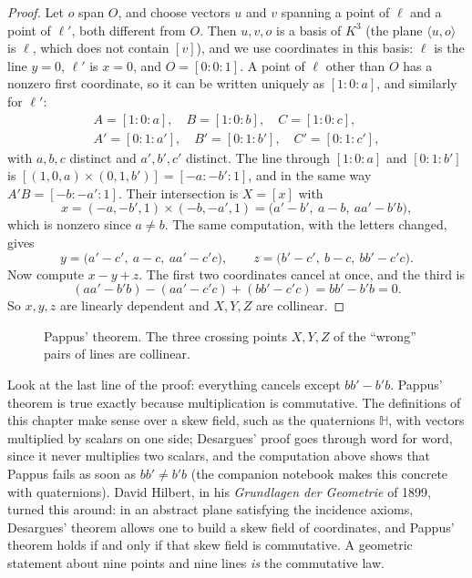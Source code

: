 \begin{proof}
Let $o$ span $O$, and choose vectors $u$ and $v$ spanning a point of $\ell$ and a point of $\ell'$, both different from $O$. Then $u,v,o$ is a basis
of $K^3$ (the plane $\langle u,o\rangle$ is $\ell$, which does not contain $[v]$), and we use coordinates in this basis: $\ell$ is the line $y=0$, $\ell'$ is
$x=0$, and $O=[0:0:1]$. A point of $\ell$ other than $O$ has a nonzero first coordinate, so it can be written uniquely as $[1:0:a]$, and
similarly for $\ell'$:
\[
\begin{gathered}
A=[1:0:a],\quad B=[1:0:b],\quad C=[1:0:c],\\
A'=[0:1:a'],\quad B'=[0:1:b'],\quad C'=[0:1:c'],
\end{gathered}
\]
with $a,b,c$ distinct and $a',b',c'$ distinct. The line through $[1:0:a]$ and $[0:1:b']$ is $[(1,0,a)\times(0,1,b')]=[-a:-b':1]$, and in the same way
$A'B=[-b:-a':1]$. Their intersection is $X=[x]$ with
\[
x=(-a,-b',1)\times(-b,-a',1)=\bigl(a'-b',\ a-b,\ aa'-b'b\bigr),
\]
which is nonzero since $a\ne b$. The same computation, with the letters changed, gives
\[
y=\bigl(a'-c',\ a-c,\ aa'-c'c\bigr),\qquad z=\bigl(b'-c',\ b-c,\ bb'-c'c\bigr).
\]
Now compute $x-y+z$. The first two coordinates cancel at once, and the third is
\[
(aa'-b'b)-(aa'-c'c)+(bb'-c'c)=bb'-b'b=0.
\]
So $x,y,z$ are linearly dependent and $X,Y,Z$ are collinear.
\end{proof}

\begin{figure}[ht]
\centering
{}
\caption{Pappus' theorem. The three crossing points $X,Y,Z$ of the ``wrong'' pairs of lines are collinear.}
\label{fig:pappus4}
\end{figure}

\begin{beauty}
Look at the last line of the proof: everything cancels except $bb'-b'b$. Pappus' theorem is true exactly because multiplication is commutative.
The definitions of this chapter make sense over a skew field, such as the quaternions $\mathbb H$, with vectors multiplied by scalars on one
side; Desargues' proof goes through word for word, since it never multiplies two scalars, and the computation above shows that Pappus fails
as soon as $bb'\ne b'b$ (the companion notebook makes this concrete with quaternions). David Hilbert, in his \emph{Grundlagen der
Geometrie} of 1899, turned this around: in an abstract plane satisfying the incidence axioms, Desargues' theorem allows one to build a skew field
of coordinates, and Pappus' theorem holds if and only if that skew field is commutative. A geometric statement about nine points and nine lines
\emph{is} the commutative law.
\end{beauty}

